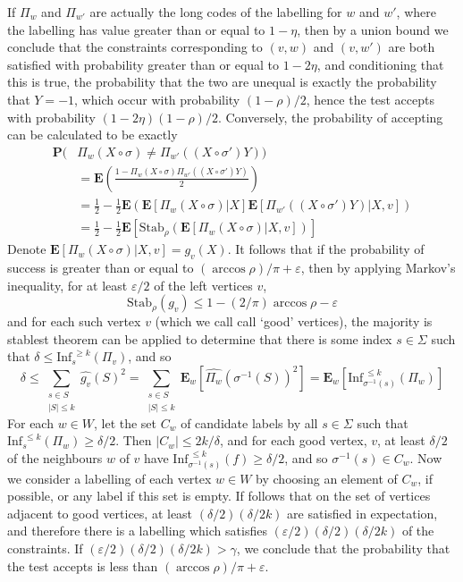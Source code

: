 If $\Pi_w$ and $\Pi_{w'}$ are actually the long codes of the labelling for $w$ and $w'$, where the labelling has value greater than or equal to $1 - \eta$, then by a union bound we conclude that the constraints corresponding to $(v,w)$ and $(v,w')$ are both satisfied with probability greater than or equal to $1 - 2\eta$, and conditioning that this is true, the probability that the two are unequal is exactly the probability that $Y = -1$, which occur with probability $(1 - \rho)/2$, hence the test accepts with probability $(1 - 2\eta)(1 - \rho)/2$. Conversely, the probability of accepting can be calculated to be exactly
%
\begin{align*}
    \mathbf{P}(&\Pi_w(X \circ \sigma) \neq \Pi_{w'}((X \circ \sigma')Y))\\
    &= \mathbf{E} \left( \frac{1 - \Pi_w(X \circ \sigma) \Pi_{w'}((X \circ \sigma')Y)}{2} \right)\\
    &= \frac{1}{2} - \frac{1}{2} \mathbf{E} \left( \mathbf{E}[\Pi_w(X \circ \sigma)|X] \mathbf{E}[\Pi_{w'}((X \circ \sigma')Y)|X,v] \right)\\
    &= \frac{1}{2} - \frac{1}{2} \mathbf{E} \left[ \text{Stab}_\rho \left( \mathbf{E}[\Pi_w(X \circ \sigma)|X,v] \right) \right]
\end{align*}
%
Denote $\mathbf{E}[\Pi_w(X \circ \sigma)|X,v] = g_v(X)$. It follows that if the probability of success is greater than or equal to $(\arccos \rho)/\pi + \varepsilon$, then by applying Markov's inequality, for at least $\varepsilon/2$ of the left vertices $v$,
%
\[ \text{Stab}_\rho \left( g_v \right) \leq 1 - (2/\pi) \arccos \rho - \varepsilon \]
%
and for each such vertex $v$ (which we call call `good' vertices), the majority is stablest theorem can be applied to determine that there is some index $s \in \Sigma$ such that $\delta \leq \text{Inf}_s^{\ \geq k}( \Pi_v )$, and so
%
\[ \delta \leq \sum_{\substack{s \in S\\|S| \leq k}} \widehat{ g_v }(S)^2 = \sum_{\substack{s \in S\\|S| \leq k}} \mathbf{E}_w \left[ \widehat{\Pi_w}(\sigma^{-1}(S))^2 \right] = \mathbf{E}_w \left[ \text{Inf}_{\sigma^{-1}(s)}^{\ \leq k}(\Pi_w) \right] \]
%
For each $w \in W$, let the set $C_w$ of candidate labels by all $s \in \Sigma$ such that $\text{Inf}_s^{\ \leq k}(\Pi_w) \geq \delta/2$. Then $|C_w| \leq 2k/\delta$, and for each good vertex, $v$, at least $\delta/2$ of the neighbours $w$ of $v$ have $\text{Inf}_{\sigma^{-1}(s)}^{\ \leq k} (f) \geq \delta/2$, and so $\sigma^{-1}(s) \in C_w$. Now we consider a labelling of each vertex $w \in W$ by choosing an element of $C_w$, if possible, or any label if this set is empty. If follows that on the set of vertices adjacent to good vertices, at least $(\delta/2)(\delta/2k)$ are satisfied in expectation, and therefore there is a labelling which satisfies $(\varepsilon/2)(\delta/2)(\delta/2k)$ of the constraints. If $(\varepsilon/2)(\delta/2)(\delta/2k) > \gamma$, we conclude that the probability that the test accepts is less than $(\arccos \rho)/\pi + \varepsilon$.

